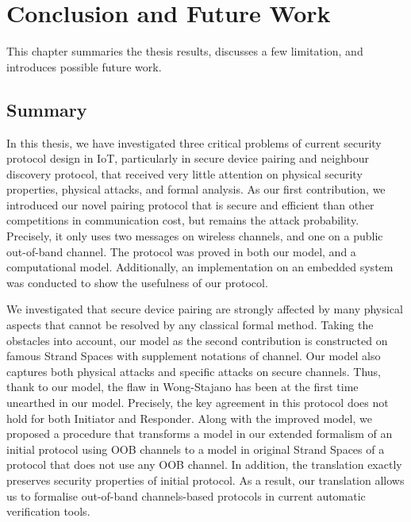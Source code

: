 
\chapter{Conclusion and Future Work} %

\label{Chapter6} %


This chapter summaries the thesis results, discusses a few limitation, and introduces possible future work. 

\section{Summary}

In this thesis, we have investigated three critical problems of current security protocol design in IoT, particularly in secure device pairing and neighbour discovery protocol, that received very little attention on physical security properties, physical attacks, and formal analysis. As our first contribution, we introduced our novel pairing protocol that is secure and efficient than other competitions in communication cost, but remains the attack probability. Precisely, it only uses two messages on wireless channels, and one on a public out-of-band channel. The protocol was proved in both our model, and a computational model. Additionally, an implementation on an embedded system was conducted to show the usefulness of our protocol. 

We investigated that secure device pairing are strongly affected by many physical aspects that cannot be resolved by any classical formal method. Taking the obstacles into account, our model as the second contribution is constructed on famous Strand Spaces with supplement notations of channel. Our model also captures both physical attacks and specific attacks on secure channels. Thus, thank to our model, the flaw in Wong-Stajano has been at the first time unearthed in our model. Precisely, the key agreement in this protocol does not hold for both Initiator and Responder. Along with the improved model, we proposed a procedure that transforms a model in our extended formalism of an initial protocol using OOB channels to a model in original Strand Spaces of a protocol that does not use any OOB channel. In addition, the translation exactly preserves security properties of initial protocol. As a result, our translation allows us to formalise out-of-band channels-based protocols in current automatic verification tools. 

